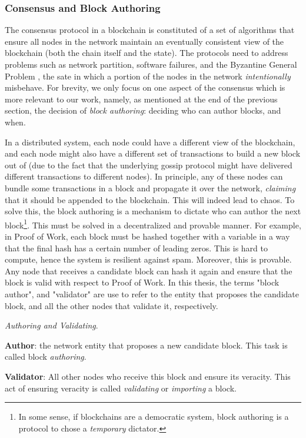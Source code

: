 \subsubsection{Consensus and Block Authoring} \label{chap_bg:subsec:consensus_authorship}

The consensus protocol in a blockchain is constituted of a set of algorithms that ensure all nodes
in the network maintain an eventually consistent view of the blockchain (both the chain itself and
the state). The protocols need to address problems such as network partition, software failures, and
the Byzantine General Problem \cite{lamportByzantineGeneralsProblem1982}, the sate in which a
portion of the nodes in the network \textit{intentionally} misbehave. For brevity, we only focus on
one aspect of the consensus which is more relevant to our work, namely, as mentioned at the end of
the previous section, the decision of \textit{block authoring}: deciding who can author blocks, and
when.

In a distributed system, each node could have a different view of the blockchain, and each node
might also have a different set of transactions to build a new block out of (due to the fact that
the underlying gossip protocol might have delivered different transactions to different nodes). In
principle, any of these nodes can bundle some transactions in a block and propagate it over the
network, \textit{claiming} that it should be appended to the blockchain. This will indeed lead to
chaos. To solve this, the block authoring is a mechanism to dictate who can author the next
block\footnote{In some sense, if blockchains are a democratic system, block authoring is a protocol
to chose a \textit{temporary} dictator.}. This must be solved in a decentralized and provable
manner. For example, in Proof of Work, each block must be hashed together with a variable in a way
that the final hash has a certain number of leading zeros. This is hard to compute, hence the system
is resilient against spam. Moreover, this is provable. Any node that receives a candidate block can
hash it again and ensure that the block is valid with respect to Proof of Work. In this thesis, the
terms "block author", and "validator" are use to refer to the  entity that proposes the candidate
block, and all the other nodes that validate it, respectively.


\begin{definition} \label{def:auhtor_validator}

	\textit{Authoring and Validating}.

	\textbf{Author}: the network entity that proposes a new candidate block. This task is
	called block \textit{authoring}.

	\textbf{Validator}: All other nodes who  receive this block and ensure its veracity. This act of
	ensuring veracity is called \textit{validating} or \textit{importing} a block.
\end{definition}


